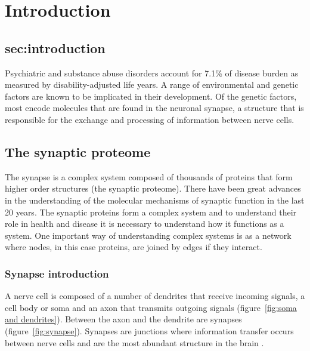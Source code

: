 \chapter{Introduction}
\label{chap:introduction}
\section{sec:introduction}

Psychiatric and substance abuse disorders account for 7.1\% of disease burden as measured by disability-adjusted life years\cite{murray2015global}.   A range of environmental and genetic factors are known to be implicated in their development. Of the genetic factors, most encode molecules that are found in the neuronal synapse, a structure that is responsible for the exchange and processing of information between nerve cells\cite{grant2012synaptopathies}.

\section{The synaptic proteome}


The synapse is a complex system composed of thousands of proteins that form higher order structures (the synaptic proteome)\cite{grant2012synaptopathies}. There have been great advances in the understanding of the molecular mechanisms of synaptic function in the last 20 years\cite{grant2018synaptomic}. The synaptic proteins form a complex system and to understand their role in health and disease it is necessary to understand how it functions as a system.  One important way of understanding complex systems is as a network where nodes, in this case proteins, are joined by edges if they interact. 





\subsection{Synapse introduction}
A nerve cell is composed of a number of dendrites that receive incoming signals, a cell body or soma and an axon that transmits outgoing signals (figure~\ref{fig:soma and dendrites}). Between the axon and the dendrite are synapses (figure~\ref{fig:synapse}). Synapses are junctions where information transfer occurs between nerve cells and are the most abundant structure in the brain \cite{grant2012synaptopathies}.

